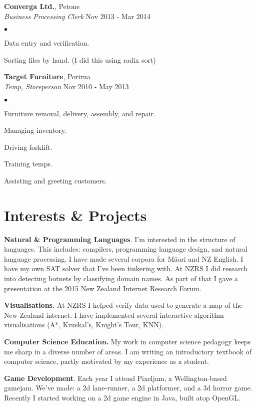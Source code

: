 \documentclass[margin,line]{res}
\newenvironment{list2}{
  \begin{list}{$\bullet$}{%
      \setlength{\itemsep}{0in}
      \setlength{\parsep}{0in} \setlength{\parskip}{0in}
      \setlength{\topsep}{0in} \setlength{\partopsep}{0in}
      \setlength{\leftmargin}{0.2in}}}
  {\end{list}}
\begin{document}
\begin{resume}
  {\bf Converga Ltd.}, Petone\\
  {\em Business Processing Clerk} \hfill {Nov 2013 - Mar 2014}
  \begin{list2} %
	\item Data entry and verification.
	\item Sorting files by hand. (I did this using radix sort)
  \end{list2}

  {\bf Target Furniture}, Porirua\\
  {\em Temp, Storeperson} \hfill{Nov 2010 - May 2013}
  \begin{list2} %
	\item Furniture removal, delivery, assembly, and repair. 
	\item Managing inventory.
	\item Driving forklift.
	\item Training temps.
	\item Assisting and greeting customers.
  \end{list2}


\section{\sc Interests \& Projects}

{\bf Natural \& Programming Languages}. I'm interested in the structure of languages. This includes: compilers, programming language design, and natural language processing. I have made several corpora for M\=aori and NZ English. I have my own SAT solver that I've been tinkering with. At NZRS I did research into detecting botnets by classifying domain names. As part of that I gave a presentation at the 2015 New Zealand Internet Research Forum.

{\bf Visualisations.} At NZRS I helped verify data used to generate a map of the New Zealand internet. I have implemented several interactive algorithm visualisations (A*, Kruskal's, Knight's Tour, KNN).

{\bf Computer Science Education.} My work in computer science pedagogy keeps me sharp in a diverse number of areas. I am writing an introductory textbook of computer science, partly motivated by my experience as a student.

{\bf Game Development}. Each year I attend Pixeljam, a Wellington-based gamejam. We've made: a 2d lane-runner, a 2d platformer, and a 3d horror game. Recently I started working on a 2d game engine in Java, built atop OpenGL.


\end{resume}
\end{document}
